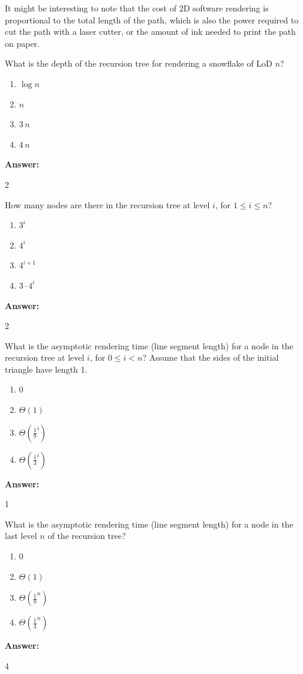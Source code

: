 \documentclass[12pt,twoside]{article}
\newcommand{\answer}{
 \par\medskip
 \textbf{Answer:}
}
\newcommand{\answerIm}{ \answer
2
}
\newcommand{\answerIn}{ \answer
2
}
\newcommand{\answerIo}{ \answer
1
}
\newcommand{\answerIp}{ \answer
4
}
\begin{document}
\begin{problems}
It might be interesting to note that the cost of 2D software rendering is
proportional to the total length of the path, which is also the power required
to cut the path with a laser cutter, or the amount of ink needed to print the
path on paper.

\begin{problemparts}
  \problempart {} What is the depth of the recursion tree for rendering a
  snowflake of LoD $n$?
    \begin{enumerate}
      \item $\log n$
      \item $n$
      \item $3 \, n$
      \item $4 \, n$
    \end{enumerate}
\answerIm

  \problempart {} How many nodes are there in the recursion tree at level
  $i$, for $1 \le i \le n$?
    \begin{enumerate}
      \item $3 ^ i$
      \item $4 ^ i$
      \item $4 ^ {i + 1}$
      \item $3 \cdot 4 ^ i$
    \end{enumerate}
\answerIn

  \problempart {} What is the asymptotic rendering time (line segment length)
  for a node in the recursion tree at level $i$, for $0 \le i < n$? Assume that
  the sides of the initial triangle have length 1.
    \begin{enumerate}
      \item $0$
      \item $\Theta(1)$
      \item $\Theta(\frac{1}{9}^i)$
      \item $\Theta(\frac{1}{3}^i)$
    \end{enumerate}
\answerIo

  \problempart {} What is the asymptotic rendering time (line segment length)
  for a node in the last level $n$ of the recursion tree?
    \begin{enumerate}
      \item $0$
      \item $\Theta(1)$
      \item $\Theta(\frac{1}{9}^n)$
      \item $\Theta(\frac{1}{3}^n)$
    \end{enumerate}
\answerIp


\end{problemparts}
\end{problems}
\end{document}
